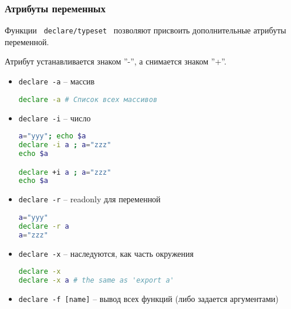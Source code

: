 \begin{frame}
	\frametitle{Атрибуты переменных}
	Функции \verb+ declare/typeset + позволяют присвоить дополнительные атрибуты переменной.

	Атрибут устанавливается знаком ''-'', а снимается знаком ''+''.

	\begin{itemize}
		\item {\tt declare -a} -- массив
			\begin{lstlisting}[language=sh]
declare -a # Список всех массивов
			\end{lstlisting} 
		\item {\tt declare -i} -- число
			\begin{lstlisting}[language=sh]
a="yyy"; echo $a
declare -i a ; a="zzz"
echo $a

declare +i a ; a="zzz"
echo $a
			\end{lstlisting}
		\item {\tt declare -r} -- readonly для переменной
			\begin{lstlisting}[language=sh]
a="yyy"
declare -r a
a="zzz"
			\end{lstlisting}
		\item {\tt declare -x} -- наследуются, как часть окружения
			\begin{lstlisting}[language=sh]
declare -x
declare -x a # the same as 'export a'
			\end{lstlisting}

		\item {\tt declare -f [name]} -- вывод всех функций (либо задается аргументами)

	\end{itemize}
\end{frame}

